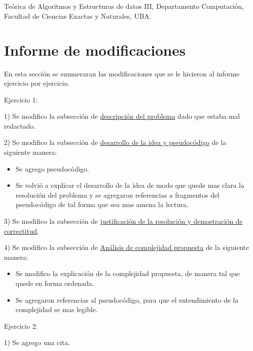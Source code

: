 \documentclass[a4paper]{article}
\begin{document}
%
\section{}
\begin{thebibliography}{abbrvnat}
 Teórica de Algoritmos y Estructuras de datos III, Departamento Computación, Facultad de Ciencias Exactas y Naturales, UBA.
\end{thebibliography}


\newpage
\section{Informe de modificaciones}

En esta sección se enumeraran las modificaciones que se le hicieron al informe ejercicio por ejercicio.

Ejercicio 1: \newline

1) Se modifico la subsección de \underline{descripción del problema} dado que estaba mal redactado.

2) Se modifico la subsección de \underline{desarrollo de la idea y pseudocódigo} de la siguiente manera:
	\begin{itemize}
		\item Se agrego pseudocódigo.
		\item Se volvió a explicar el desarrollo de la idea de modo que quede mas clara la resolución del problema y se agregaron referencias a fragmentos del pseudocódigo de tal forma que sea mas amena la lectura.
	\end{itemize}
	
3) Se modifico la subsección de \underline{justificación de la resolución y demostración de correctitud}.	
	
4) Se modifico la subsección de \underline{Análisis de complejidad propuesta} de la siguiente manera:	
	\begin{itemize}
		\item Se modifico la explicación de la complejidad propuesta, de manera tal que quede en forma ordenada.
		\item Se agregaron referencias al pseudocódigo, para que el entendimiento de la complejidad se mas legible.
	\end{itemize}

Ejercicio 2: \newline

1) Se agrego una cita.

\bigskip
\end{document}
